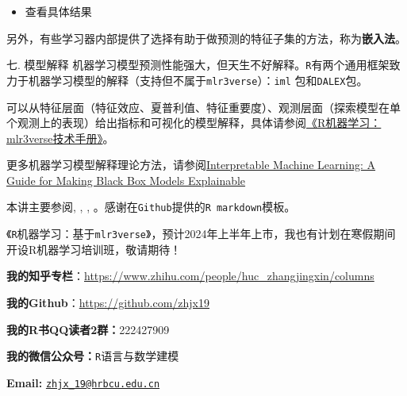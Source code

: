 \documentclass[
  11pt,
  ignorenonframetext,
  dvipsnames,UTF8]{beamer}
\newenvironment{Shaded}{\begin{snugshade}}{\end{snugshade}}
\newcommand{\CommentTok}[1]{\textcolor[rgb]{0.56,0.35,0.01}{\textit{#1}}}
\newcommand{\FunctionTok}[1]{\textcolor[rgb]{0.00,0.00,0.00}{#1}}
\newcommand{\NormalTok}[1]{#1}
\newcommand{\SpecialCharTok}[1]{\textcolor[rgb]{0.00,0.00,0.00}{#1}}
\providecommand{\tightlist}{%
  \setlength{\itemsep}{0pt}\setlength{\parskip}{0pt}}
\begin{document}
\begin{frame}[fragile]{}
\protect\hypertarget{section-49}{}
\begin{itemize}
\tightlist
\item
  查看具体结果
\end{itemize}

\begin{Shaded}
\end{Shaded}

另外，有些学习器内部提供了选择有助于做预测的特征子集的方法，称为\textbf{嵌入法}。
\end{frame}

\begin{frame}[fragile]{七. 模型解释}
\protect\hypertarget{ux4e03.-ux6a21ux578bux89e3ux91ca}{}
机器学习模型预测性能强大，但天生不好解释。\texttt{R}有两个通用框架致力于机器学习模型的解释（支持但不属于\texttt{mlr3verse}）：\texttt{iml}
包和\texttt{DALEX}包。

可以从特征层面（特征效应、夏普利值、特征重要度）、观测层面（探索模型在单个观测上的表现）给出指标和可视化的模型解释，具体请参阅\href{https://gitee.com/zhjx19/rconf15}{《R机器学习：mlr3verse技术手册》}\citep{mlr3manual}。

更多机器学习模型解释理论方法，请参阅\href{https://christophm.github.io/interpretable-ml-book/}{Interpretable
Machine Learning: A Guide for Making Black Box Models Explainable}
\end{frame}

\begin{frame}[fragile]{}
\protect\hypertarget{section-50}{}
本讲主要参阅\citep{mlr3book}, \citep{mlr3gallery}, \citep{mlr3talk},
\citep{mlr3pipelines}。感谢\citep{huang}在\texttt{Github}提供的\texttt{R\ markdown}\citep{xie}模板。

《\texttt{R}机器学习：基于\texttt{mlr3verse}》，预计2024年上半年上市，我也有计划在寒假期间开设R机器学习培训班，敬请期待！

\textbf{我的知乎专栏}：\url{https://www.zhihu.com/people/huc_zhangjingxin/columns}

\textbf{我的Github}：\url{https://github.com/zhjx19}

\textbf{我的R书QQ读者2群：}222427909

\textbf{我的微信公众号：}\texttt{R}语言与数学建模

\textbf{Email:}
\href{mailto:zhjx_19@hrbcu.edu.cn}{\nolinkurl{zhjx\_19@hrbcu.edu.cn}}
\end{frame}
\end{document}
